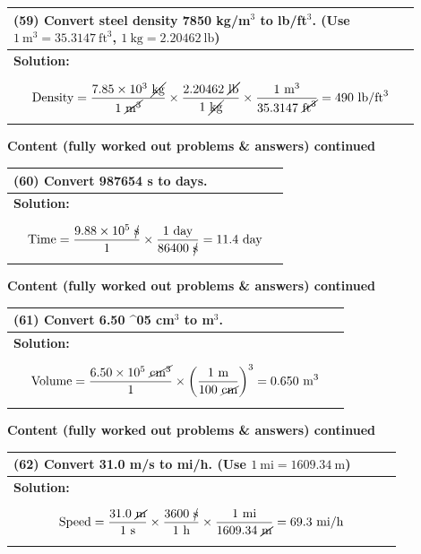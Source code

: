 \documentclass{article}
\begin{document}
\begin{tabular}{|p{0.9\linewidth}|}
\hline
\vspace{0.2cm}

\textbf{(59)} Convert steel density 7850 kg/m$^3$ to lb/ft$^3$. (Use $1~\text{m}^3=35.3147~\text{ft}^3$, $1~\text{kg}=2.20462~\text{lb}$) \\
\hline
\textbf{Solution:} \\
\[
\text{Density} = \frac{7.85 \times 10^3~\cancel{\text{kg}}}{1~\cancel{\text{m}^3}} \times \frac{2.20462~\cancel{\text{lb}}}{1~\cancel{\text{kg}}} \times \frac{1~\text{m}^3}{35.3147~\cancel{\text{ft}^3}} = 490~\text{lb}/\text{ft}^3
\]
\\
\hline
\end{tabular}
\newpage
\noindent
{\large \textbf{Content (fully worked out problems \& answers) continued}} \\[0.2em]
\begin{tabular}{|p{0.9\linewidth}|}
\hline
\vspace{0.2cm}

\textbf{(60)} Convert 987654 s to days. \\
\hline
\textbf{Solution:} \\
\[
\text{Time} = \frac{9.88 \times 10^5~\cancel{\text{s}}}{1} \times \frac{1~\text{day}}{86400~\cancel{\text{s}}} = 11.4~\text{day}
\]
\\
\hline
\end{tabular}
\newpage
\noindent
{\large \textbf{Content (fully worked out problems \& answers) continued}} \\[0.2em]
\begin{tabular}{|p{0.9\linewidth}|}
\hline
\vspace{0.2cm}

\textbf{(61)} Convert 6.50 \times 10^05 cm$^3$ to m$^3$. \\
\hline
\textbf{Solution:} \\
\[
\text{Volume} = \frac{6.50 \times 10^5~\cancel{\text{cm}^3}}{1} \times \left(\frac{1~\text{m}}{100~\cancel{\text{cm}}}\right)^3 = 0.650~\text{m}^3
\]
\\
\hline
\end{tabular}
\newpage
\noindent
{\large \textbf{Content (fully worked out problems \& answers) continued}} \\[0.2em]
\begin{tabular}{|p{0.9\linewidth}|}
\hline
\vspace{0.2cm}

\textbf{(62)} Convert 31.0 m/s to mi/h. (Use $1~\text{mi}=1609.34~\text{m}$) \\
\hline
\textbf{Solution:} \\
\[
\text{Speed} = \frac{31.0~\cancel{\text{m}}}{1~\text{s}} \times \frac{3600~\cancel{\text{s}}}{1~\text{h}} \times \frac{1~\text{mi}}{1609.34~\cancel{\text{m}}} = 69.3~\text{mi/h}
\]
\\
\hline
\end{tabular}
\end{document}
